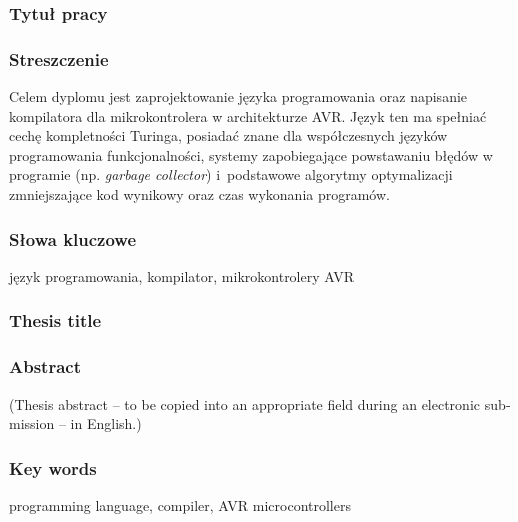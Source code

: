 \subsubsection*{Tytuł pracy} 
\Title

\subsubsection*{Streszczenie}  
Celem dyplomu jest zaprojektowanie języka programowania oraz napisanie kompilatora dla mikrokontrolera w architekturze AVR. Język ten ma spełniać cechę kompletności Turinga, posiadać znane dla współczesnych języków programowania funkcjonalności, systemy zapobiegające powstawaniu błędów w programie (np. \foreignlanguage{british}{\emph{garbage collector}}) i~podstawowe algorytmy optymalizacji zmniejszające kod wynikowy oraz czas wykonania programów.

\subsubsection*{Słowa kluczowe} 
język programowania, kompilator, mikrokontrolery AVR

\subsubsection*{Thesis title} 
\begin{otherlanguage}{british}
\TitleAlt
\end{otherlanguage}

\subsubsection*{Abstract} 
\begin{otherlanguage}{british}
(Thesis abstract – to be copied into an appropriate field during an electronic submission – in English.)
\end{otherlanguage}
\subsubsection*{Key words}  
\begin{otherlanguage}{british}
programming language, compiler, AVR microcontrollers
\end{otherlanguage}

